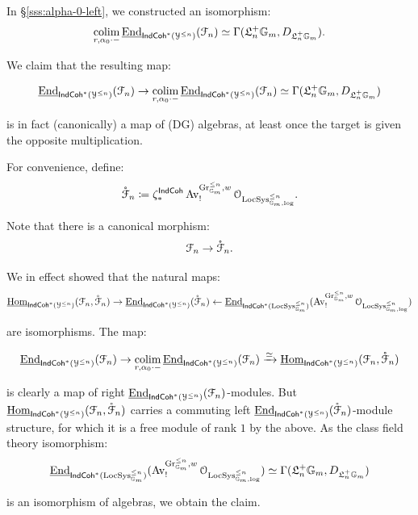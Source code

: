 \documentclass[reqno,11pt]{amsart}
\numberwithin{equation}{subsection}
\theoremstyle{remark}
\newcommand{\xar}[1]{\xrightarrow{#1}}
\newcommand{\rar}[1]{\xar{#1}}
\newcommand{\isom}{\rar{\simeq}}
\newcommand{\bG}{{\mathbb G}}
\newcommand{\sF}{{\EuScript F}}
\newcommand{\sO}{{\EuScript O}}
\newcommand{\sY}{{\EuScript Y}}
\newcommand{\fL}{{\mathfrak L}}
\newcommand{\on}{\operatorname}
\newcommand{\ul}{\underline}
\newcommand{\End}{\on{End}}
\newcommand{\Hom}{\on{Hom}}
\newcommand{\Gr}{\on{Gr}}
\newcommand{\LocSys}{\on{LocSys}}
\newcommand{\colim}{\on{colim}}
\newcommand{\Av}{\on{Av}}
\newcommand{\IndCoh}{\mathsf{IndCoh}}
\renewcommand{\o}[1]{\mathring{#1}}
\begin{document}
\subsubsection{}\label{sss:alpha-alg}

In \S \ref{sss:alpha-0-left}, we constructed an isomorphism:
%
\[
\underset{r,\alpha_0\cdot-}{\colim} \, \ul{\End}_{\IndCoh^*(\sY^{\leq n})}(\sF_n)
\simeq 
\Gamma(\fL_n^+ \bG_m,D_{\fL_n^+ \bG_m}).
\]

\noindent We claim that the resulting map:

\[
\ul{\End}_{\IndCoh^*(\sY^{\leq n})}(\sF_n) \to 
\underset{r,\alpha_0\cdot-}{\colim} \, \ul{\End}_{\IndCoh^*(\sY^{\leq n})}(\sF_n)
\simeq \Gamma(\fL_n^+ \bG_m,D_{\fL_n^+ \bG_m})
\]

\noindent is in fact (canonically) a map of (DG) algebras, at least
once the target is given the opposite multiplication. 

For convenience, define:
%
\[
\o{\sF}_n \coloneqq 
\zeta_*^{\IndCoh}\Av_!^{\Gr_{\bG_m}^{\leq n},w}\sO_{\LocSys_{\bG_m,\log}^{\leq n}}.
\]

\noindent Note that there is a canonical morphism:
%
\[
\sF_n \to \o{\sF}_n.
\]

\noindent We in effect showed that the natural maps:
%
\[
\ul{\Hom}_{\IndCoh^*(\sY^{\leq n})}(\sF_n,\o{\sF}_n) \to 
\ul{\End}_{\IndCoh^*(\sY^{\leq n})}(\o{\sF}_n)  \leftarrow 
\ul{\End}_{\IndCoh^*(\LocSys_{\bG_m}^{\leq n})}
(\Av_!^{\Gr_{\bG_m}^{\leq n},w}\sO_{\LocSys_{\bG_m,\log}^{\leq n}})
\]

\noindent are isomorphisms. The map:

\[
\ul{\End}_{\IndCoh^*(\sY^{\leq n})}(\sF_n) \to 
\underset{r,\alpha_0\cdot-}{\colim} \, \ul{\End}_{\IndCoh^*(\sY^{\leq n})}(\sF_n)
\isom 
\ul{\Hom}_{\IndCoh^*(\sY^{\leq n})}(\sF_n,\o{\sF}_n)
\]

\noindent is clearly a map of right 
$\ul{\End}_{\IndCoh^*(\sY^{\leq n})}(\sF_n)$-modules.
But $\ul{\Hom}_{\IndCoh^*(\sY^{\leq n})}(\sF_n,\o{\sF}_n)$ carries
a commuting left 
$\ul{\End}_{\IndCoh^*(\sY^{\leq n})}(\o{\sF}_n)$-module structure,
for which it is a free module of rank $1$ by the above. 
As the class field theory isomorphism:
%
\begin{equation}\label{eq:lcft-diff}
\ul{\End}_{\IndCoh^*(\LocSys_{\bG_m}^{\leq n})}
(\Av_!^{\Gr_{\bG_m}^{\leq n},w}\sO_{\LocSys_{\bG_m,\log}^{\leq n}})
\simeq \Gamma(\fL_n^+ \bG_m,D_{\fL_n^+ \bG_m})
\end{equation}

\noindent is an isomorphism of algebras, we obtain the claim.
\end{document}
